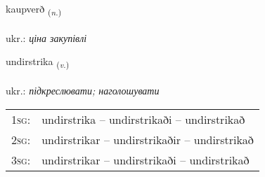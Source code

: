 \documentclass[frontgrid, backgrid]{flacards}\usepackage[]{graphicx}\usepackage[]{xcolor}
\begin{document}
\renewcommand{\blhead}{\vskip5pt {\small\bfseries\footnotesize Nafnorð | іменник }}
\renewcommand{\bcfoot}{\vskip5pt \hspace{2pt}{\small\bfseries\footnotesize 3K}}


{kaupverð \small{\textsubscript{(\textit{n.})}} \\[1ex] %
\textphonetic{[kʰœiːpvɛrð]} \\
ukr.: \emph{ціна закупівлі} \\  [2ex]
\renewcommand*{\arraystretch}{0.8}
}

\renewcommand{\flhead}{\vskip5pt \fboxsep=0pt {\small\bfseries\footnotesize Sagnorð | дієслово}}
\renewcommand{\fcfoot}{\vskip5pt \fboxsep=0pt \hspace{2pt}{\small\bfseries\footnotesize 3K}}

\renewcommand{\blhead}{\vskip5pt {\small\bfseries\footnotesize Sagnorð | дієслово }}
\renewcommand{\bcfoot}{\vskip5pt \hspace{2pt}{\small\bfseries\footnotesize 3K}}


{undirstrika \small{\textsubscript{(\textit{v.})}} \\[1ex] %
 \\
ukr.: \emph{підкреслювати; наголошувати} \\  [2ex]
\renewcommand*{\arraystretch}{0.8}
\begin{tabular}{p{1cm}l}
\textsc{1sg}: & undirstrika -- undirstrikaði -- undirstrikað \\ 
\textsc{2sg}: & undirstrikar -- undirstrikaðir -- undirstrikað \\ 
\textsc{3sg}: & undirstrikar -- undirstrikaði -- undirstrikað \\ 
\end{tabular}
}
\end{document}
